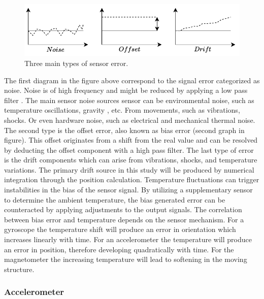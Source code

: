 \begin{figure}[!h]
    \centering
    \includegraphics[width=1\textwidth]{figures/noise.pdf}
    \caption{Three main types of sensor error.}
    \label{fig:noise}
\end{figure}

The first diagram in the figure above correspond to the signal error categorized as noise. Noise is of high frequency and might be reduced by applying a low pass filter \cite{kaiser1977data}. The main sensor noise sources sensor can be environmental noise, such as temperature oscillations, gravity , etc. From movements, such as vibrations, shocks. Or even hardware noise, such as electrical and mechanical thermal noise.
The second type is the offset error, also known as bias error (second graph in figure). This offset originates from a shift from the real value and can be resolved by deducting the offset component with a high pass filter.
The last type of error is the drift components which can arise from vibrations, shocks, and temperature variations. The primary drift source in this study will be produced by numerical integration through the position calculation.
Temperature fluctuations can trigger instabilities in the bias of the sensor signal. By utilizing a supplementary sensor to determine the ambient temperature, the bias generated error can be counteracted by applying adjustments to the output signals. The correlation between bias error and temperature depends on the sensor mechanism. For a gyroscope the temperature shift will produce an error in orientation which increases linearly with time. For an accelerometer the temperature will produce an error in position, therefore developing quadratically with time. For the magnetometer the increasing temperature will lead to softening in the moving structure.

\subsubsection{Accelerometer}

